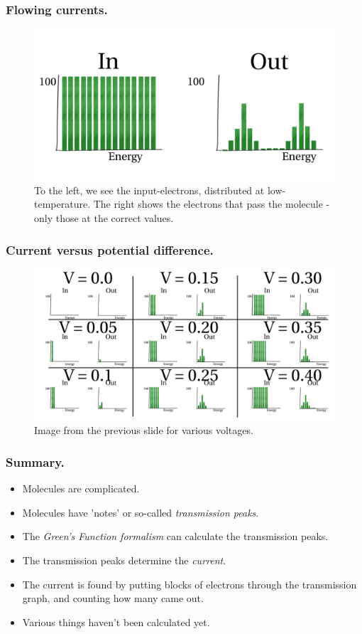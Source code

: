 \begin{frame}
    \frametitle{Flowing currents.}
    \begin{figure}[!b] 
        \centering
        \includegraphics[height=0.5\textheight]{fig/current.pdf}
        \caption{To the left, we see the input-electrons, distributed at low-temperature. The right shows the electrons that pass the molecule - only those at the correct values.}
    \end{figure} 
\end{frame}%
\begin{frame}
    \frametitle{Current versus potential difference.}
    \begin{figure}[!b] 
        \centering
        \includegraphics[width=\textwidth]{fig/current_calculation2.pdf}
        \caption{Image from the previous slide for various voltages.}
    \end{figure} 
\end{frame}%
% 
\begin{frame}
    \frametitle{Summary.}
    \begin{itemize}
        \item Molecules are complicated.
        \item Molecules have 'notes' or so-called \emph{transmission peaks}.
        \item The \emph{Green's Function formalism} can calculate the transmission peaks.
        \item The transmission peaks determine the \emph{current}.
        \item The current is found by putting blocks of electrons through the transmission graph, and counting how many came out.
        \item Various things haven't been calculated yet.
    \end{itemize} 
\end{frame}
